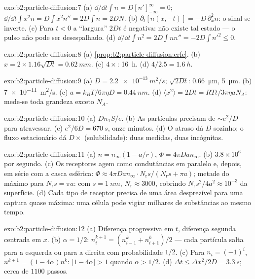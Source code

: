 \begin{solution}{exo:b2:particle-diffusion:7}
(a) $\dd/\dd t\int n = D[n']_{-\infty}^{\infty} = 0$; $\dd/\dd t\int x^2 n = D\int
x^2 n'' = 2D\int n = 2DN$. (b) $\partial_t[n(x,-t)] = -D\,\partial_x^2 n$: o
sinal se inverte. (c) Para $t < 0$ a ``largura'' $2Dt$ é negativa: não existe tal
estado --- o pulso não pode ser desespalhado. (d) $\dd/\dd t\int n^2 = 2D\int nn''
= -2D\int n'^2 \le 0$.
\end{solution}

\begin{solution}{exo:b2:particle-diffusion:8}
(a) \cref{prop:b2:particle-diffusion:erfc}. (b) $x = 2 \times 1.16\sqrt{Dt}
= \qty{0.62}{mm}$. (c) $4\times$: \qty{16}{h}. (d) $4/2.5 = \qty{1.6}{h}$.
\end{solution}

\begin{solution}{exo:b2:particle-diffusion:9}
(a) $D = \qty{2.2e-13}{m^2/s}$; $\sqrt{2Dt}$: \qty{0.66}{\micro m},
\qty{5}{\micro m}. (b) \qty{7e-11}{m^2/s}. (c) $a = k_BT/6\pi\eta D =
\qty{0.44}{nm}$. (d) $\langle x^2\rangle = 2Dt = RTt/3\pi\eta a N_A$: mede-se
toda grandeza exceto $N_A$.
\end{solution}

\begin{solution}{exo:b2:particle-diffusion:10}
(a) $Dn_1S/e$. (b) As partículas precisam de $\sim e^2/D$ para atravessar. (c)
$e^2/6D = \qty{670}{s}$, onze minutos. (d) O atraso dá $D$ sozinho;
o fluxo estacionário dá $D \times$ (solubilidade): duas medidas,
duas incógnitas.
\end{solution}

\begin{solution}{exo:b2:particle-diffusion:11}
(a) $n = n_\infty(1 - a/r)$, $\Phi = 4\pi D a n_\infty$. (b) $3.8 \times
10^6$ por segundo. (c) Os receptores agem como condutâncias em paralelo e,
depois, em série com a casca esférica: $\Phi \approx 4\pi Dan_\infty
\cdot N_{\text{r}}s/(N_{\text{r}}s + \pi a)$; metade do máximo para
$N_{\text{r}}s = \pi a$: com $s = \qty{1}{nm}$, $N_{\text{r}} \approx
3000$, cobrindo $N_{\text{r}}s^2/4a^2 \approx 10^{-3}$ da superfície.
(d) Cada tipo de receptor precisa de uma área desprezível para uma captura
quase máxima: uma célula pode vigiar milhares de substâncias ao mesmo tempo.
\end{solution}

\begin{solution}{exo:b2:particle-diffusion:12}
(a) Diferença progressiva em $t$, diferença segunda centrada em $x$. (b)
$\alpha = 1/2$: $n_i^{k+1} = (n_{i-1}^k + n_{i+1}^k)/2$ --- cada partícula salta
para a esquerda ou para a direita com probabilidade $1/2$. (c) Para $n_i = (-1)^i$, $n^{k+1} =
(1 - 4\alpha)n^k$: $|1 - 4\alpha| > 1$ quando $\alpha > 1/2$. (d) $\Delta t \le
\Delta x^2/2D = \qty{3.3}{s}$; cerca de $1100$ passos.
\end{solution}

